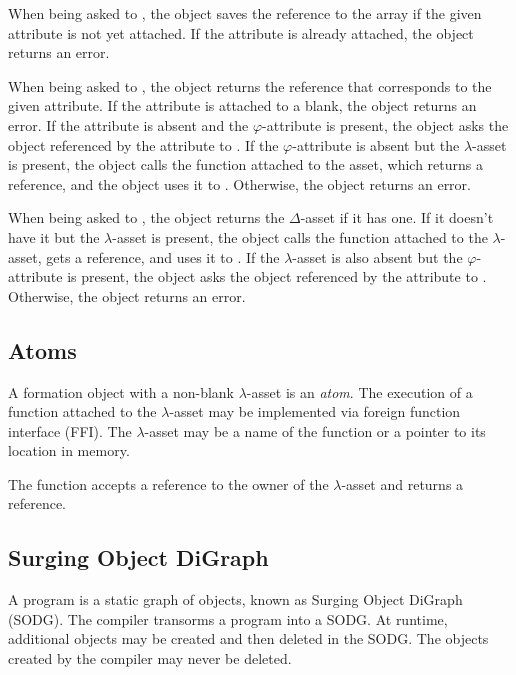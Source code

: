 When being asked to , the object saves the reference to the array if the given attribute is not yet attached.
If the attribute is already attached, the object returns an error.

When being asked to , the object returns the reference that corresponds to the given attribute.
If the attribute is attached to a blank, the object returns an error.
If the attribute is absent and the \(\varphi\)-attribute is present, the object asks the object referenced by the attribute to .
If the \(\varphi\)-attribute is absent but the \(\lambda\)-asset is present, the object calls the function attached to the asset, which returns a reference, and the object uses it to .
Otherwise, the object returns an error.

When being asked to , the object returns the \(\Delta\)-asset if it has one.
If it doesn't have it but the \(\lambda\)-asset is present, the object calls the function attached to the \(\lambda\)-asset, gets a reference, and uses it to .
If the \(\lambda\)-asset is also absent but the \(\varphi\)-attribute is present, the object asks the object referenced by the attribute to .
Otherwise, the object returns an error.

\subsection{Atoms}

A formation object with a non-blank \(\lambda\)-asset is an \emph{atom}.
The execution of a function attached to the \(\lambda\)-asset may be implemented via foreign function interface (FFI).
The \(\lambda\)-asset may be a name of the function or a pointer to its location in memory.

The function accepts a reference to the owner of the \(\lambda\)-asset and returns a reference.

\subsection{Surging Object DiGraph}

A program is a static graph of objects, known as Surging Object DiGraph (SODG).
The compiler transorms a program into a SODG.
At runtime, additional objects may be created and then deleted in the SODG.
The objects created by the compiler may never be deleted.

